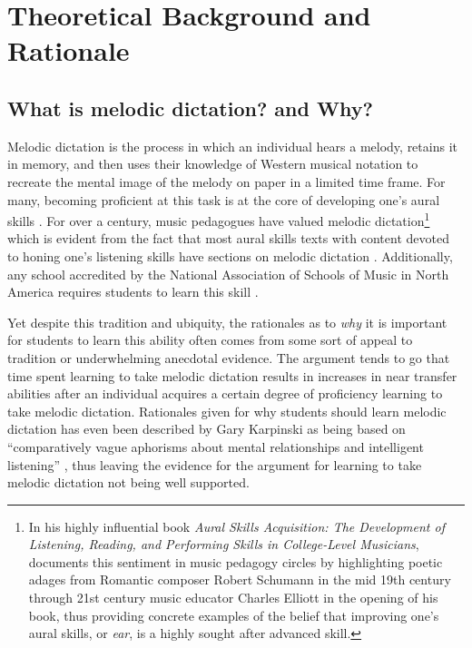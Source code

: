 \documentclass[]{book}
\let\rmarkdownfootnote\footnote%
\def\footnote{\protect\rmarkdownfootnote}
\begin{document}
\hypertarget{intro}{%
\chapter{Theoretical Background and Rationale}\label{intro}}

\hypertarget{what-is-melodic-dictation-and-why}{%
\section{What is melodic dictation? and Why?}\label{what-is-melodic-dictation-and-why}}

Melodic dictation is the process in which an individual hears a melody, retains it in memory, and then uses their knowledge of Western musical notation to recreate the mental image of the melody on paper in a limited time frame.
For many, becoming proficient at this task is at the core of developing one's aural skills \citep{karpinskiModelMusicPerception1990}.
For over a century, music pedagogues have valued melodic dictation\footnote{In his highly influential book \emph{Aural Skills Acquisition: The Development of Listening, Reading, and Performing Skills in College-Level Musicians}, \citet{karpinskiAuralSkillsAcquisition2000} documents this sentiment in music pedagogy circles by highlighting poetic adages from Romantic composer Robert Schumann in the mid 19th century through 21st century music educator Charles Elliott in the opening of his book, thus providing concrete examples of the belief that improving one's aural skills, or \emph{ear}, is a highly sought after advanced skill.} which is evident from the fact that most aural skills texts with content devoted to honing one's listening skills have sections on melodic dictation \citep{karpinskiAuralSkillsAcquisition2000}.
Additionally, any school accredited by the National Association of Schools of Music in North America requires students to learn this skill \citep[ §VIII.6.B.2.A]{NationalAssociationSchools2018}.

Yet despite this tradition and ubiquity, the rationales as to \emph{why} it is important for students to learn this ability often comes from some sort of appeal to tradition or underwhelming anecdotal evidence.
The argument tends to go that time spent learning to take melodic dictation results in increases in near transfer abilities after an individual acquires a certain degree of proficiency learning to take melodic dictation.
Rationales given for why students should learn melodic dictation has even been described by Gary Karpinski as being based on ``comparatively vague aphorisms about mental relationships and intelligent listening'' \citep[p.192]{karpinskiModelMusicPerception1990}, thus leaving the evidence for the argument for learning to take melodic dictation not being well supported.
\end{document}

